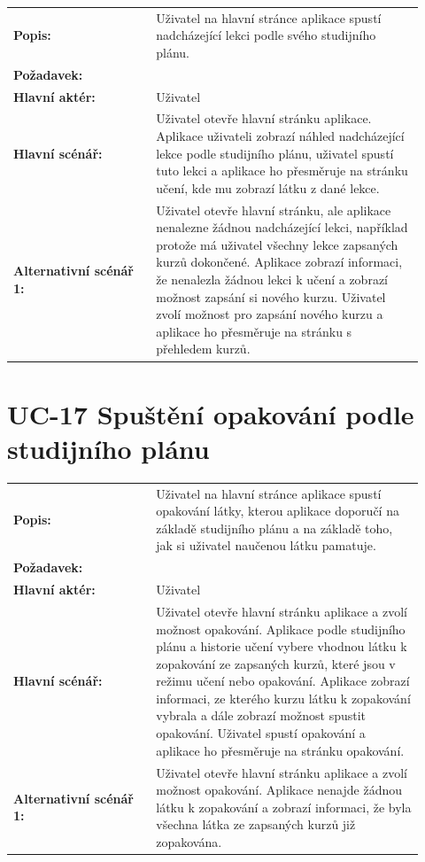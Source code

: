 \begin{tabular}{p{0.32\linewidth}p{0.6\linewidth}}
  \textbf{Popis:} & Uživatel na hlavní stránce aplikace spustí nadcházející lekci podle svého studijního plánu. \\
  \textbf{Požadavek:} & \nameref{sec:fp-study-plan-learning} \\
  \textbf{Hlavní aktér:} & Uživatel \\
  \textbf{Hlavní scénář:} & Uživatel otevře hlavní stránku aplikace. Aplikace uživateli zobrazí náhled nadcházející lekce podle studijního plánu, uživatel spustí tuto lekci a aplikace ho přesměruje na stránku učení, kde mu zobrazí látku z dané lekce. \\
  \textbf{Alternativní scénář 1:} & Uživatel otevře hlavní stránku, ale aplikace nenalezne žádnou nadcházející lekci, například protože má uživatel všechny lekce zapsaných kurzů dokončené. Aplikace zobrazí informaci, že nenalezla žádnou lekci k učení a zobrazí možnost zapsání si nového kurzu. Uživatel zvolí možnost pro zapsání nového kurzu a aplikace ho přesměruje na stránku s přehledem kurzů. \\
\end{tabular}

\section{UC-17 Spuštění opakování podle studijního plánu}\label{sec:uc-17}

\begin{tabular}{p{0.32\linewidth}p{0.6\linewidth}}
  \textbf{Popis:} & Uživatel na hlavní stránce aplikace spustí opakování látky, kterou aplikace doporučí na základě studijního plánu a na základě toho, jak si uživatel naučenou látku pamatuje. \\
  \textbf{Požadavek:} & \nameref{sec:fp-study-plan-learning} \\
  \textbf{Hlavní aktér:} & Uživatel \\
  \textbf{Hlavní scénář:} & Uživatel otevře hlavní stránku aplikace a zvolí možnost opakování. Aplikace podle studijního plánu a historie učení vybere vhodnou látku k zopakování ze zapsaných kurzů, které jsou v režimu učení nebo opakování. Aplikace zobrazí informaci, ze kterého kurzu látku k zopakování vybrala a dále zobrazí možnost spustit opakování. Uživatel spustí opakování a aplikace ho přesměruje na stránku opakování. \\
  \textbf{Alternativní scénář 1:} & Uživatel otevře hlavní stránku aplikace a zvolí možnost opakování. Aplikace nenajde žádnou látku k zopakování a zobrazí informaci, že byla všechna látka ze zapsaných kurzů již zopakována. \\
\end{tabular}

